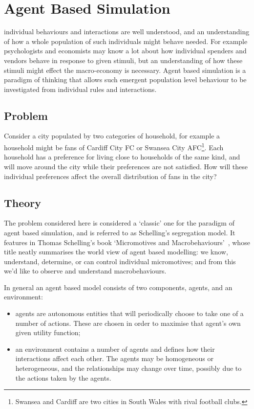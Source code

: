 \chapter[Agent Based Simulation]{Agent Based Simulation}\label{chp:agent_based_simulation}

 individual behaviours and
interactions are well understood,
and an understanding of how a whole population of such
individuals might behave needed. For example psychologists and economists may know a
lot about how individual spenders and vendors behave in response to given
stimuli, but an understanding of how these stimuli might effect the
macro-economy is necessary.
Agent based simulation is a paradigm of
thinking that allows such emergent population level behaviour to be investigated
from individual rules and interactions.

\section{Problem}\label{sec:agent_based_simulation_problem}

Consider a city populated by two categories of household, for example a household
might be fans of Cardiff City FC or Swansea City AFC\footnote{Swansea and
Cardiff are two cities in South Wales with rival football clubs.}.
Each household has a
preference for living close to households of the same kind, and will move
around the city while their preferences are not satisfied.
How will these individual preferences affect the overall distribution of fans in
the city?

\section{Theory}\label{sec:agent_based_simulation_theory}

The problem considered here is considered a `classic' one for the paradigm of
agent based simulation, and is referred to as Schelling's segregation model.
It features in Thomas Schelling's book `Micromotives and
Macrobehaviours'~\cite{schelling2006micromotives}, whose
title neatly summarises the world view of agent based modelling: we know,
understand, determine, or can control individual micromotives; and from this
we'd like to observe and understand macrobehaviours.

In general an agent based model consists of two components, agents, and an
environment:

\begin{itemize}
  \item agents are autonomous entities that will periodically choose to take one
        of a number of actions.
        These are chosen in order to maximise that agent's own given utility
        function;
  \item an environment contains a number of agents and defines how their
        interactions affect each other.
        The agents may be homogeneous or heterogeneous, and the
        relationships may change over time, possibly due to the actions taken
        by the agents.
\end{itemize}

